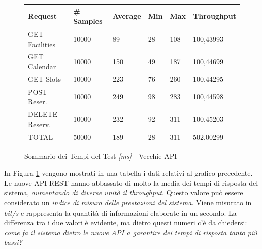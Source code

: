 \begin{figure}[H]
    \begin{table}[H]
        \centering
        \begin{tabular}{ |p{3cm}||p{2cm}|p{2cm}|p{1cm}|p{1cm}|p{2cm}| }
            \hline
            Request & \# Samples & Average  & Min & Max &  Throughput\\
            \hline
            GET Facilities      & 10000    & 89   & 28 & 108 & 100,43993      \\
            GET Calendar        & 10000    & 150   & 49 & 187        & 100,44699      \\
            GET Slots        & 10000    & 223   & 76 & 260        & 100.44295      \\
            POST Reser.        & 10000    & 249    & 98 & 283        & 100,44598      \\
            DELETE Reserv.        & 10000    & 232    & 92 & 311        & 100,45203      \\
            TOTAL        & 50000    & 189    & 28 & 311        & 502,00299      \\
            \hline
        \end{tabular}
    \end{table}
    \caption{Sommario dei Tempi del Test \textit{[ms]} - Vecchie API}
    \label{fig:newapi100t_summary}
\end{figure}
In Figura \ref{fig:newapi100t_summary} vengono mostrati in una tabella i dati relativi al grafico precedente. Le nuove API REST hanno abbassato di molto la media dei tempi di risposta del sistema, \emph{aumentando di diverse unità il throughput}. Questo valore può essere considerato un \emph{indice di misura delle prestazioni del sistema}. Viene misurato in \emph{bit/s} e rappresenta la quantità di informazioni elaborate in un secondo. La differenza tra i due valori è evidente, ma dietro questi numeri c'è da chiedersi: \emph{come fa il sistema dietro le nuove API a garantire dei tempi di risposta tanto più bassi?}

